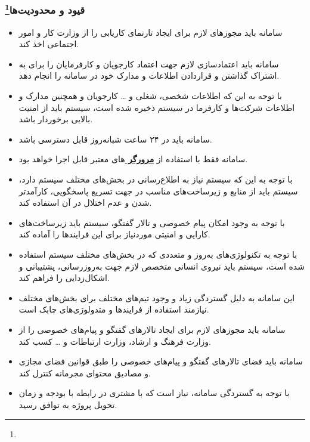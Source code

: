 \documentclass[12pt]{article}
\begin{document}
	\subsubsection{قیود و محدودیت‌ها\footnote{}}
	\begin{itemize}
		\item
		سامانه باید مجوز‌های لازم برای ایجاد تارنمای کاریابی را از وزارت کار و امور اجتماعی اخذ کند.
		\item
		سامانه باید اعتماد‌سازی لازم جهت اعتماد کارجویان و کارفرمایان را برای به اشتراک گذاشتن و قرار‌دادن اطلاعات و مدارک خود در سامانه را انجام دهد.
		\item
		با توجه به این که اطلاعات شخصی، شغلی و … کارجویان و همچنین مدارک و اطلاعات شرکت‌ها و کارفرما در سیستم ذخیره شده است، سیستم باید از امنیت بالایی برخوردار باشد.
		\item
		سامانه باید در ۲۴ ساعت شبانه‌روز قابل دسترسی باشد.
		\item
		سامانه فقط با استفاده از \textbf{\hyperref[ref:browser]{مرورگر }}‌های معتبر قابل اجرا خواهد‌ بود.
		\item
		با توجه به این که سیستم نیاز به اطلاع‌رسانی در بخش‌های مختلف سیستم دارد، سیستم باید از منابع و زیرساخت‌های مناسب در جهت تسریع پاسخگویی، کارآمدتر شدن و عدم اختلال در آن استفاده کند.
		\item
		با توجه به وجود امکان پیام خصوصی و تالار گفتگو، سیستم باید زیرساخت‌های کارایی و امنیتی مورد‌نیاز برای این فرایند‌ها را آماده کند.
		\item
		با توجه به تکنولوژی‌های به‌روز و متعددی که در بخش‌های مختلف سیستم استفاده شده است، سیستم باید نیروی انسانی متخصص لازم جهت به‌روزرسانی، پشتیبانی و اشکال‌زدایی را فراهم کند.
		\item
		این سامانه به دلیل گستردگی زیاد و وجود تیم‌های مختلف برای بخش‌های مختلف نیازمند استفاده از فرایند‌ها و متدولوژی‌های چابک است.
		\item
		سامانه باید مجوزهای لازم برای ایجاد تالار‌های گفتگو و پیام‌های خصوصی را از وزارت فرهنگ و ارشاد، وزارت ارتباطات و … کسب کند.
		\item
		سامانه باید فضای تالار‌های گفتگو و پیام‌های خصوصی را طبق قوانین فضای مجازی و مصادیق محتوای مجرمانه کنترل کند.
		\item
		با توجه به گستردگی سامانه، نیاز است که با مشتری در رابطه با بودجه و زمان تحویل پروژه به توافق رسید.
	\end{itemize}
\end{document}
